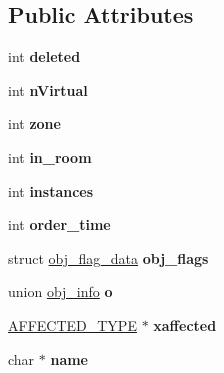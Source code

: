 \subsection*{Public Attributes}
\begin{DoxyCompactItemize}
\item 
\hypertarget{structobj__data_ac3e759c982b48a9a005f6abbd25a5513}{int {\bfseries deleted}}\label{structobj__data_ac3e759c982b48a9a005f6abbd25a5513}

\item 
\hypertarget{structobj__data_a0f86b2c16ca687349eac79f4e5f92180}{int {\bfseries n\-Virtual}}\label{structobj__data_a0f86b2c16ca687349eac79f4e5f92180}

\item 
\hypertarget{structobj__data_ada72f4e7a40147ab161250ee1843a125}{int {\bfseries zone}}\label{structobj__data_ada72f4e7a40147ab161250ee1843a125}

\item 
\hypertarget{structobj__data_a2424a71688fa1798153e3c0fdb535d48}{int {\bfseries in\-\_\-room}}\label{structobj__data_a2424a71688fa1798153e3c0fdb535d48}

\item 
\hypertarget{structobj__data_a3c0562ffffd732f1b26397de0fc4d5e9}{int {\bfseries instances}}\label{structobj__data_a3c0562ffffd732f1b26397de0fc4d5e9}

\item 
\hypertarget{structobj__data_a882013eee406f79b916041750a9d3820}{int {\bfseries order\-\_\-time}}\label{structobj__data_a882013eee406f79b916041750a9d3820}

\item 
\hypertarget{structobj__data_a7bd3e58c91ec7bec7ee0e52f0bb911ec}{struct \hyperlink{structobj__flag__data}{obj\-\_\-flag\-\_\-data} {\bfseries obj\-\_\-flags}}\label{structobj__data_a7bd3e58c91ec7bec7ee0e52f0bb911ec}

\item 
\hypertarget{structobj__data_ad9caadfa2dc5e579859ef20d261e673d}{union \hyperlink{unionobj__info}{obj\-\_\-info} {\bfseries o}}\label{structobj__data_ad9caadfa2dc5e579859ef20d261e673d}

\item 
\hypertarget{structobj__data_a4bfd45954d19b332a63708fbced73edd}{\hyperlink{structaffected__type}{A\-F\-F\-E\-C\-T\-E\-D\-\_\-\-T\-Y\-P\-E} $\ast$ {\bfseries xaffected}}\label{structobj__data_a4bfd45954d19b332a63708fbced73edd}

\item 
\hypertarget{structobj__data_a8068fb72e861d43aa55a43e4e7380313}{char $\ast$ {\bfseries name}}\label{structobj__data_a8068fb72e861d43aa55a43e4e7380313}


\end{DoxyCompactItemize}
